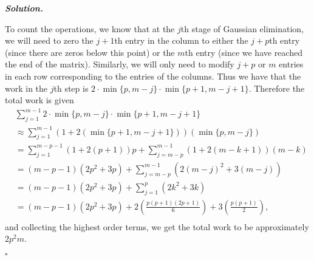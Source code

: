 \documentclass[12pt]{report}
\newenvironment{solution}[1][\it{Solution}]{\textbf{#1. } }{$\square$}
\newcommand{\paren}[1]{{\left(#1\right)}} %
\begin{document}
\begin{solution}
\begin{enumerate}
            
            \noindent
            To count the operations, we know that at the $j$th stage of Gaussian elimination, we will need to zero the $j+1$th entry in the column to either the $j + p$th entry (since there are zeros below this point) or the $m$th entry (since we have reached the end of the matrix). Similarly, we will only need to modify $j+p$ or $m$ entries in each row corresponding to the entries of the columns. Thus we have that the work in the $j$th step is $2\cdot \min\{p,m-j\} \cdot \min\{p+1,m-j+1\}.$ Therefore the total work is given
            \begin{align*}
                &\sum_{j = 1}^{m-1}2\cdot \min\{p,m-j\} \cdot \min\{p+1,m-j+1\}\\ 
                &\approx \sum_{j=1}^{m-1}(1 + 2(\min\{p+1,m-j+1\}))(\min\{p,m-j\})\\
                &=\sum_{j=1}^{m-p-1}(1+2(p+1))p + \sum_{j=m-p}^{m-1}(1 + 2(m-k+1))(m-k)\\
                &= (m-p-1)(2p^2+3p)+\sum_{j=m-p}^{m-1}(2(m-j)^2 + 3(m-j))\\
                &= (m-p-1)(2p^2+3p)+\sum_{j=1}^{p}(2k^2 +3k)\\
                &= (m-p-1)(2p^2+3p)+2\paren{\frac{p(p+1)(2p+1)}{6}} + 3\paren{\frac{p(p+1)}{2}},\\
            \end{align*} 
            and collecting the highest order terms, we get the total work to be approximately $2p^2m$. 

    \end{enumerate}
\end{solution}

\vskip 20pt


\end{document}
